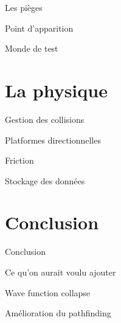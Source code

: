 \documentclass{beamer}
\begin{document}
{\begin{frame}{Les pièges}
\end{frame}

\begin{frame}{Point d'apparition}

\end{frame}

\begin{frame}{Monde de test}

\end{frame}

\section{La physique}
\begin{frame}{Gestion des collisions}

\end{frame}

\begin{frame}{Platformes directionnelles}

\end{frame}

\begin{frame}{Friction}

\end{frame}

\begin{frame}{Stockage des données}

\end{frame}

\section{Conclusion}
\begin{frame}{Conclusion}

\end{frame}

\begin{frame}{Ce qu'on aurait voulu ajouter}

\end{frame}

\begin{frame}{Wave function collapse}

\end{frame}

\begin{frame}{Amélioration du pathfinding}

\end{frame}

}
\end{document}
